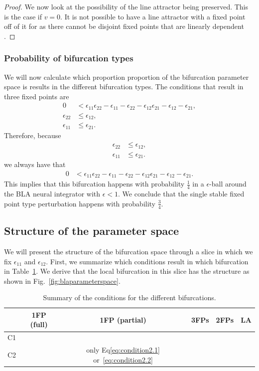 \documentclass{article} %
\newcounter{ct}
\newcommand{\cmark}{\ding{51}}%
\newcommand{\xmark}{\ding{55}}%
\theoremstyle{definition}
\theoremstyle{remark}
\begin{document}
\begin{proof}
We now look at the possibility of the line attractor being preserved.
This is the case if \(v=0\).
It is not possible to have a line attractor with a fixed point off of it for as there cannot be disjoint fixed points that are linearly dependent \citep[Lemma 5.2]{morrison2016a}.
\end{proof}




\subsubsection{Probability of bifurcation types}\label{sec:supp:probbla}
We will now calculate which proportion proportion of the bifurcation parameter space is results in the different bifurcation types.
The conditions  that result in three fixed points are
\begin{align*}
0 &< \epsilon_{11}\epsilon_{22}-\epsilon_{11}-\epsilon_{22}-\epsilon_{12}\epsilon_{21}-\epsilon_{12}-\epsilon_{21},\\
\epsilon_{22} &\leq \epsilon_{12},\\
\epsilon_{11} &\leq \epsilon_{21}.
\end{align*}
Therefore, because
\begin{align*}
\epsilon_{22} &\leq \epsilon_{12},\\
\epsilon_{11} &\leq \epsilon_{21}.
\end{align*}
we always have that
\begin{align*}
0 &< \epsilon_{11}\epsilon_{22}-\epsilon_{11}-\epsilon_{22}-\epsilon_{12}\epsilon_{21}-\epsilon_{12}-\epsilon_{21}.
\end{align*}
This implies that this bifurcation happens with probability \(\frac{1}{4}\)  in a \(\epsilon\)-ball around the BLA neural integrator with \(\epsilon<1\).
We conclude that the single stable fixed point type perturbation happens with probability \(\frac{3}{4}\).


\subsection{Structure of the parameter space}
We will present the structure of the bifurcation space through a slice in which we fix  \(\epsilon_{11}\) and \(\epsilon_{12}\).
First, we summarize which conditions result in which bifurcation in Table~\ref{tab:bifs}.
We derive that the local bifurcation in this slice  has the structure as shown in Fig.~\ref{fig:blaparameterspace}.
\begin{table}[H]
\caption{Summary of the conditions for the different bifurcations.}\label{tab:bifs}
\centering
\bgroup
\def\arraystretch{1.52}
\begin{tabular}{|c||c|c|c|c|c|}
\hline
& 1FP (full) 		& 1FP (partial) & 3FPs & 2FPs & LA  \\\hline \hline
C1 & \cmark	 	& \xmark 	 & \cmark & \xmark & \xmark \\\hline
C2 & \xmark 		& only Eq\ref{eq:condition2.1} or~\ref{eq:condition2.2}  	 & \cmark & \cmark& \xmark \\\hline
\end{tabular}
\egroup
\end{table}
\end{document}
